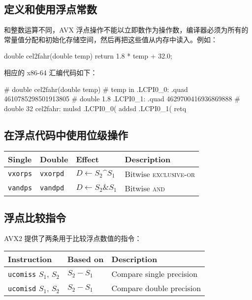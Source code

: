 \subsection{定义和使用浮点常数}

和整数运算不同，AVX 浮点操作不能以立即数作为操作数，编译器必须为所有的常量值分配和初始化存储空间，然后再把这些值从内存中读入。例如：

\begin{cppcode}
double cel2fahr(double temp) {
  return 1.8 * temp + 32.0;
}
\end{cppcode}

相应的 x86-64 汇编代码如下：

\begin{gascode}
# double cel2fahr(double temp)
# temp in %
.LCPI0_0:
    .quad   4610785298501913805     # double 1.8
.LCPI0_1:
    .quad   4629700416936869888     # double 32
cel2fahr:
    mulsd   .LCPI0_0(%
    addsd   .LCPI0_1(%
    retq
\end{gascode}

\subsection{在浮点代码中使用位级操作}

\begin{table}[!ht]
    \centering
    \begin{tabular}{llll}
        \toprule
        Single & Double & Effect & Description \\
        \midrule
        \texttt{vxorps} & \texttt{vxorpd} & $D \leftarrow S_2 \^{} S_1$ & Bitwise \textsc{exclusive-or} \\
        \texttt{vandps} & \texttt{vandpd} & $D \leftarrow S_2 \& S_1$ & Bitwise \textsc{and} \\
        \bottomrule
    \end{tabular}
\end{table}

\subsection{浮点比较指令}

AVX2 提供了两条用于比较浮点数值的指令：

\begin{table}[!ht]
    \centering
    \begin{tabular}{lll}
        \toprule
        Instruction & Based on & Description \\
        \midrule
        \texttt{ucomiss} $S_1$, $S_2$ & $S_2 - S_1$ & Compare single precision \\
        \texttt{ucomisd} $S_1$, $S_2$ & $S_2 - S_1$ & Compare double precision \\
        \bottomrule
    \end{tabular}
\end{table}

